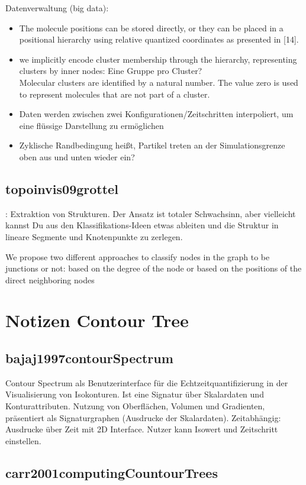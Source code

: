 Datenverwaltung (big data):
\begin{itemize}
	\item The molecule positions can be stored directly, or they can be placed in a positional hierarchy using relative quantized coordinates as presented in [14].
	\item we implicitly encode cluster membership through the hierarchy, representing clusters by inner nodes: Eine Gruppe pro Cluster?\\
	Molecular clusters are identified by a natural number. The value zero is used to represent molecules that are not part of a cluster.
	\item Daten werden zwischen zwei Konfigurationen/Zeitschritten interpoliert, um eine flüssige Darstellung zu ermöglichen
	\item Zyklische Randbedingung heißt, Partikel treten an der Simulationsgrenze oben aus und unten wieder ein?
\end{itemize}

\section{topoinvis09grottel}
\cite{topoinvis09grottel}: Extraktion von Strukturen. Der Ansatz ist totaler Schwachsinn, aber vielleicht kannst Du aus den Klassifikations-Ideen etwas ableiten und die Struktur in lineare Segmente und Knotenpunkte zu zerlegen.

We propose two different approaches to classify nodes in the graph to be junctions or not: based on the degree of the node or based on the positions of the direct neighboring nodes

\chapter{Notizen Contour Tree}

\section{bajaj1997contourSpectrum}
Contour Spectrum als Benutzerinterface für die Echtzeitquantifizierung in der Visualisierung von Isokonturen. Ist eine Signatur über Skalardaten und Konturattributen. Nutzung von Oberflächen, Volumen und Gradienten, präsentiert als Signaturgraphen (Ausdrucke der Skalardaten). Zeitabhängig: Ausdrucke über Zeit mit 2D Interface. Nutzer kann Isowert und Zeitschritt einstellen.

\section{carr2001computingCountourTrees}
\cite{carr2001computingCountourTrees}

